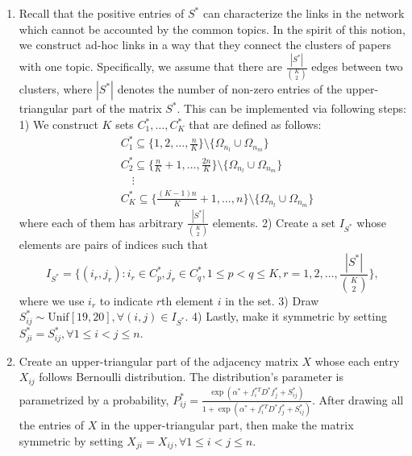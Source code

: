 \documentclass[AMS,STIX1COL]{WileyNJD-v2}
\begin{document}
{\begin{enumerate}
    \item Recall that the positive entries of $S^*$ can characterize the links in the network which cannot be accounted by the common topics.
        In the spirit of this notion, we construct ad-hoc links in a way that they connect the clusters of papers with one topic.
        Specifically, we assume that there are $\frac{|S^*|}{\binom{K}{2}}$ edges between two clusters, where $|S^*|$ denotes the number of non-zero entries of the upper-triangular part of the matrix $S^*$.
        This can be implemented via following steps:
        1) We construct $K$ sets $C^*_1,\dots,C^*_K$ that are defined as follows:
        \begin{align*}
           &C^*_{1} \subseteq \big\{1, 2, \dots, \frac{n}{K} \big\} \setminus \big\{ \Omega_{n_l}
           \cup \Omega_{n_m} \big\} \\
           &C^*_{2} \subseteq \big\{\frac{n}{K}+1, \dots, \frac{2n}{K} \big\} \setminus \big\{ \Omega_{n_l} \cup \Omega_{n_m} \big\}  \\
           & \quad \vdots \\
           &C^*_{K} \subseteq \big\{\frac{(K-1)n}{K}+1, \dots, n \big\} \setminus \big\{ \Omega_{n_l}
           \cup \Omega_{n_m} \big\}
        \end{align*}
        where each of them has arbitrary $\frac{|S^*|}{\binom{K}{2}}$ elements.
        2) Create a set $I_{S^*}$ whose elements are pairs of indices such that
        \[
            I_{S^*} =
            \bigg\{ (i_r,j_r) : i_r \in C^*_p, j_r \in C^*_q, 1 \leq p < q \leq K,   r = 1,2,\dots,\frac{|S^*|}{\binom{K}{2}} \bigg\},
        \]
        where we use $i_r$ to indicate $r$th element $i$ in the set.
        3) Draw $S^*_{ij} \sim \mbox{Unif}[19,20], \forall (i,j) \in I_{S^*}$.
        4) Lastly, make it symmetric by setting $S^*_{ji}=S^*_{ij},\forall 1\leq i < j \leq n$.
    \item Create an upper-triangular part of the adjacency matrix $X$ whose each entry $X_{ij}$ follows Bernoulli distribution.
        The distribution's parameter is parametrized by a probability, $P^{*}_{ij}=\frac{\exp (\alpha^{*}+f^{*T}_{i}D^{*}f^{*}_{j} +  S^{*}_{ij})}{1+\exp(\alpha^{*}+f^{*T}_{i}D^{*}f^{*}_{j} +  S^{*}_{ij})}$.
        After drawing all the entries of $X$ in the upper-triangular part, then make the matrix symmetric by setting $X_{ji}=X_{ij},\forall 1 \leq i < j \leq n$.
\end{enumerate}


}
\end{document}
